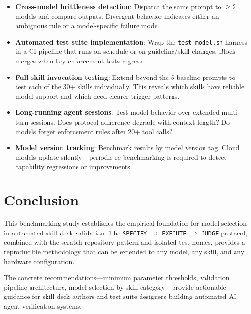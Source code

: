\documentclass[11pt,a4paper]{article}
\begin{document}
\begin{itemize}
    \item \textbf{Cross-model brittleness detection}: Dispatch the same prompt to $\geq$2 models and compare outputs. Divergent behavior indicates either an ambiguous rule or a model-specific failure mode.
    \item \textbf{Automated test suite implementation}: Wrap the \texttt{test-model.sh} harness in a CI pipeline that runs on schedule or on guideline/skill changes. Block merges when key enforcement tests regress.
    \item \textbf{Full skill invocation testing}: Extend beyond the 5 baseline prompts to test each of the 30+ skills individually. This reveals which skills have reliable model support and which need clearer trigger patterns.
    \item \textbf{Long-running agent sessions}: Test model behavior over extended multi-turn sessions. Does protocol adherence degrade with context length? Do models forget enforcement rules after 20+ tool calls?
    \item \textbf{Model version tracking}: Benchmark results by model version tag. Cloud models update silently—periodic re-benchmarking is required to detect capability regressions or improvements.
\end{itemize}

\section{Conclusion}

This benchmarking study establishes the empirical foundation for model selection in automated skill deck validation. The \texttt{SPECIFY} $\rightarrow$ \texttt{EXECUTE} $\rightarrow$ \texttt{JUDGE} protocol, combined with the scratch repository pattern and isolated test homes, provides a reproducible methodology that can be extended to any model, any skill, and any hardware configuration.

The concrete recommendations—minimum parameter thresholds, validation pipeline architecture, model selection by skill category—provide actionable guidance for skill deck authors and test suite designers building automated AI agent verification systems.
\end{document}
